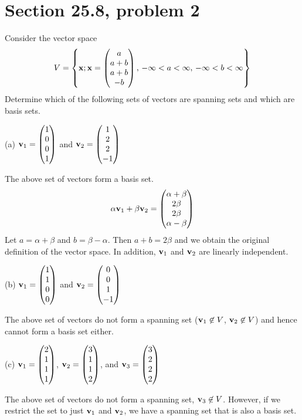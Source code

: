 \section{Section 25.8, problem 2}
Consider the vector space
$$
V=\left\{
{\bf x}; {\bf x}=\left(\begin{matrix}
a\cr
a+b\cr
a+b\cr
-b
\end{matrix}\right),\,
-\infty<a<\infty,\,
-\infty<b<\infty
\right\}
$$
Determine which of the following sets of vectors are spanning sets
and which are basis sets.

\bigskip
\noindent
(a) ${\bf v}_1=\left(\begin{matrix}1\cr0\cr0\cr1\end{matrix}\right)$ and
${\bf v}_2=\left(\begin{matrix}1\cr2\cr2\cr-1\end{matrix}\right)$

\bigskip
\noindent
The above set of vectors form a basis set.
$$
\alpha{\bf v}_1+\beta{\bf v}_2=\left(\begin{matrix}
\alpha+\beta\cr
2\beta\cr
2\beta\cr
\alpha-\beta
\end{matrix}\right)
$$
Let $a=\alpha+\beta$ and $b=\beta-\alpha$.
Then $a+b=2\beta$ and we obtain the original definition
of the vector space.
In addition, ${\bf v}_1$ and ${\bf v}_2$ are linearly independent.

\bigskip
\noindent
(b) ${\bf v}_1=\left(\begin{matrix}1\cr1\cr0\cr0\end{matrix}\right)$ and
${\bf v}_2=\left(\begin{matrix}0\cr0\cr1\cr-1\end{matrix}\right)$

\bigskip
\noindent
The above set of vectors do not form a spanning set
(${\bf v}_1\not\in V$, ${\bf v}_2\not\in V$)
and hence cannot form a basis
set either.

\bigskip
\noindent
(c) 
${\bf v}_1=\left(\begin{matrix}2\cr1\cr1\cr1\end{matrix}\right)$,
${\bf v}_2=\left(\begin{matrix}3\cr1\cr1\cr2\end{matrix}\right)$, and
${\bf v}_3=\left(\begin{matrix}3\cr2\cr2\cr2\end{matrix}\right)$

\bigskip
\noindent
The above set of vectors do not form a spanning set, ${\bf v}_3\not\in V$.
However, if we restrict the set to just ${\bf v}_1$ and ${\bf v}_2$,
we have a spanning set that is also a basis set.

